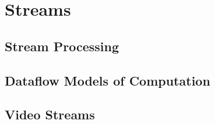 \chapter{Streams}
\label{chapter:streams}


\section{Stream Processing}
\label{sec:stream-processing}


\section{Dataflow Models of Computation}
\label{sec:dataflow-models}


\section{Video Streams}
\label{sec:video-streams}


